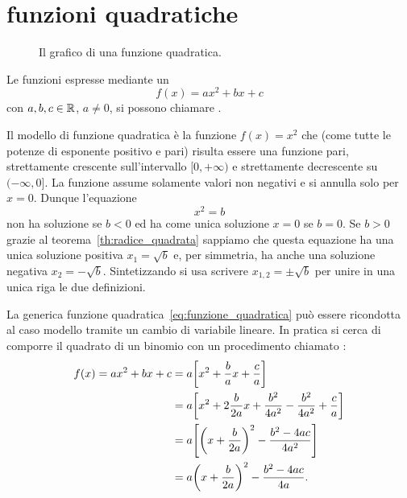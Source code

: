 \section{funzioni quadratiche}

\begin{figure}
  \begin{center}
  \end{center}
  \caption{Il grafico di una funzione quadratica.}
  \label{fig:funzione_lineare}
\end{figure}

Le funzioni espresse mediante un 
\begin{equation}\label{eq:funzione_quadratica}
  f(x) = ax^2 + bx +c
\end{equation}
con $a,b,c\in \mathbb R$, $a\neq 0$, si possono chiamare
.

Il modello di funzione quadratica è la funzione
$f(x) = x^2$ che (come tutte le potenze di esponente positivo e pari)
risulta essere una funzione pari, strettamente crescente
sull'intervallo $[0,+\infty)$ e strettamente decrescente
su $(-\infty,0]$. La funzione assume solamente valori non negativi
e si annulla solo per $x=0$.
Dunque l'equazione
\[
  x^2 = b
\]
non ha soluzione se $b<0$ ed ha come unica soluzione $x=0$ se $b=0$.
Se $b>0$ grazie al teorema~\ref{th:radice_quadrata} sappiamo che
questa equazione ha una unica soluzione positiva $x_1 = \sqrt{b}$
e, per simmetria, ha anche una soluzione negativa $x_2 = -\sqrt{b}$.
Sintetizzando si usa scrivere $x_{1,2} = \pm \sqrt{b}$
per unire in una unica riga le due definizioni.

La generica funzione quadratica~\eqref{eq:funzione_quadratica}
può essere ricondotta al caso modello tramite un cambio
di variabile lineare. In pratica si cerca di comporre il quadrato
di un binomio con un procedimento chiamato
:
\begin{equation}\label{eq:24589}
\begin{aligned}
f(x) = ax^2+bx+c
  &= a {\left[ x^2+\frac b a x + \frac c a \right]}\\
  &= a {\left[ x^2+2 \frac{b}{2a} x + \frac{b^2}{4a^2} - \frac{b^2}{4a^2} + \frac c a \right]}\\
  &= a {\left[ {\left( x+\frac{b}{2a} \right)}^2 - \frac{b^2-4ac}{4a^2} \right]} \\
  &= a{\left( x+\frac b{2a} \right)}^2  - \frac{b^2-4ac}{4a}.
\end{aligned}
\end{equation}

